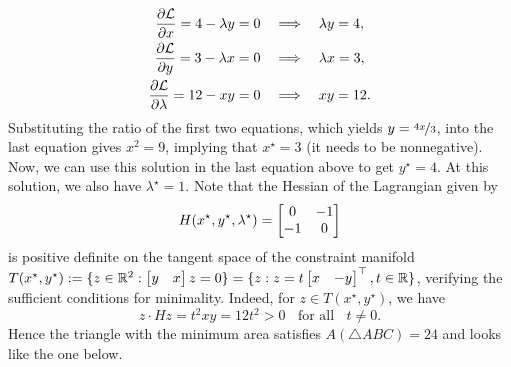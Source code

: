 %
\begin{align*}
    \frac{\partial \mathcal{L}}{\partial x} = 4 - \lambda y = 0 \quad &\Longrightarrow \quad \lambda y = 4, \\
    \frac{\partial \mathcal{L}}{\partial y} = 3 - \lambda x = 0 \quad &\Longrightarrow \quad \lambda x = 3, \\
    \frac{\partial \mathcal{L}}{\partial \lambda} = 12 - xy = 0 \quad &\Longrightarrow \quad xy = 12.
\end{align*}
%
Substituting the ratio of the first two equations, which yields $y =
\nicefrac{4x}{3}$, into the last equation gives $x^2 = 9$, implying that
$x^\star = 3$ (it needs to be nonnegative). Now, we can use this solution in the
last equation above to get $y^\star = 4$. At this solution, we also have
$\lambda^\star=1$. Note that the Hessian of the Lagrangian given by
\[H(x^\star, y^\star, \lambda^\star) = \begin{bmatrix}
    0 & -1 \\ -1 & 0
\end{bmatrix} \]
%
is positive definite on the tangent space of the constraint manifold $T(x^\star,
y^\star) := \{z \in \mathbb{R}^2: \begin{bmatrix}y & x\end{bmatrix}z = 0 \} = \{z: z = t \begin{bmatrix}x &
-y\end{bmatrix}^\top, t \in \mathbb{R}\}$, verifying the sufficient conditions for
minimality. Indeed, for $z \in T(x^\star, y^\star)$, we have 
\[z \cdot Hz = t^2 xy = 12t^2 > 0 \;\; \text{ for all } \;\; t \neq 0. \]
%
Hence the triangle with the minimum area satisfies $A(\triangle ABC) = 24$ and
looks like the one below.
%
